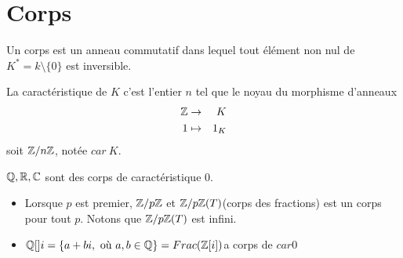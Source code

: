 \section{Corps}


\begin{definition}
	Un corps est un anneau commutatif dans lequel tout élément non nul de $K^* = k \setminus \{0\}$ est inversible.
\end{definition}

\begin{definition}
	La caractéristique de $K$ c'est l'entier $n$ tel que le noyau du morphisme d'anneaux
	\begin{eqnarray*}
		\mathbb{Z} &\to& K \\
		1 &\mapsto& 1_K
	\end{eqnarray*}
	soit $\mathbb{Z}/n\mathbb{Z}$, notée $car \ K$.
\end{definition}

\begin{example}
	$\mathbb{Q}, \mathbb{R}, \mathbb{C}$ sont des corps de caractéristique 0.
	\begin{itemize}
		\item Lorsque $p$ est premier, $\mathbb{Z}/p\mathbb{Z}$ et $\mathbb{Z}/p\mathbb{Z}(T)$(corps des fractions) est un corps pour tout $p$. Notons que $\mathbb{Z}/p\mathbb{Z}(T)$ est infini.
		\item $\mathbb{Q}[]i = \left\{ a + bi , \text{ où } a,b \in \mathbb{Q}\right\} = Frac (\mathbb{Z}[i])$a corps de $car 0$
	\end{itemize}
\end{example}


